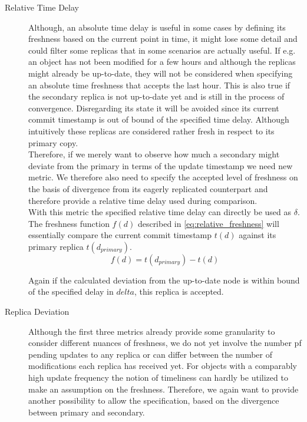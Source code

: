\begin{description}
    \item [Relative Time Delay] 
    Although, an absolute time delay is useful in some cases by defining its freshness based on the current point in time, 
    it might lose some detail and could filter some replicas that in some scenarios are actually useful.
    If e.g. an object has not been modified for a few hours and although the replicas might already be up-to-date, they will not be considered when specifying 
    an absolute time freshness that accepts the last hour.
    This is also true if the secondary replica is not up-to-date yet and is still in the process of convergence.
    Disregarding its state it will be avoided since its current commit timestamp is out of bound of the specified time delay.
    Although intuitively these replicas are considered rather fresh in respect to its primary copy.\\
    Therefore, if we merely want to observe how much a secondary might deviate from the primary in terms of the update timestamp we need new metric.
    We therefore also need to specify the accepted level of freshness on the basis of divergence from its eagerly replicated counterpart and therefore provide a relative time delay
    used during comparison.\\
    With this metric the specified relative time delay can directly be used as $\delta$. The freshness function $f(d)$ described in \ref{eq:relative_freshness}
    will essentially compare the current commit timestamp $t(d)$ against its primary replica $t(d_{primary})$.
        \begin{equation} \label{eq:relative_freshness}
            f(d) = t(d_{primary}) - t(d)
        \end{equation}

    Again if the calculated deviation from the up-to-date node is within bound of the specified delay in $delta$, this replica is accepted.

    \item [Replica Deviation] Although the first three metrics already provide some granularity to consider different nuances of freshness, we 
        do not yet involve the number pf pending updates to any replica or can differ between the number of modifications each replica has received yet.
        For objects with a comparably high update frequency the notion of timeliness can hardly be utilized to make an assumption on the freshness.
        Therefore, we again want to provide another possibility to allow the specification, based on the divergence between primary and secondary.


\end{description}
